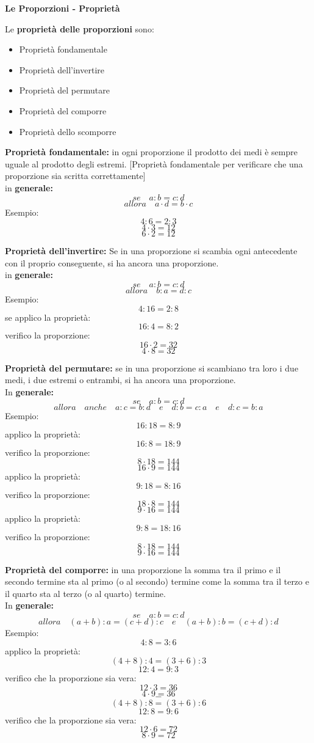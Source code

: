 \documentclass[14pt]{extarticle}
\begin{document}
\begin{center}
    \LARGE{\textbf{Le Proporzioni - Proprietà}}
\end{center}
\vspace{1cm}
Le \textbf{proprietà delle proporzioni} sono:
\begin{itemize}
    \item Proprietà fondamentale
    \item Proprietà dell'invertire
    \item Proprietà del permutare
    \item Proprietà del comporre
    \item Proprietà dello scomporre
\end{itemize}
\textbf{Proprietà fondamentale:} in ogni proporzione il prodotto dei medi è sempre uguale al prodotto degli estremi. [Proprietà fondamentale per verificare che una proporzione sia scritta correttamente]\\
in \textbf{generale:}
\[se\quad a:b=c:d\]
\[allora \quad a\cdot d=b\cdot c\]
Esempio: 
\[4:6=2:3\]
\[4\cdot3=12\]
\[6\cdot2=12\]

\textbf{Proprietà dell'invertire:} Se in una proporzione si scambia ogni antecedente con il proprio conseguente, si ha ancora una proporzione.\\
in \textbf{generale:}
\[se\quad a:b=c:d\]
\[allora \quad b:a=d:c\]
Esempio:
\[4:16=2:8\]
se applico la proprietà:
\[16:4=8:2\]
verifico la proporzione:
\[16\cdot2=32\]
\[4\cdot8=32\]

\textbf{Proprietà del permutare:} se in una proporzione si scambiano tra loro i due medi, i due estremi o entrambi, si ha ancora una proporzione. \\
In \textbf{generale:}
\[se\quad a:b=c:d\]
\[allora\quad anche\quad a:c=b:d\quad e\quad d:b=c:a\quad e\quad d:c=b:a\]
Esempio:
\[16:18=8:9\]
applico la proprietà: 
\[16:8=18:9\]
verifico la proporzione:
\[8\cdot18=144\]
\[16\cdot9=144\]
applico la proprietà: 
\[9:18=8:16\]
verifico la proporzione:
\[18\cdot8=144\]
\[9\cdot16=144\]
applico la proprietà: 
\[9:8=18:16\]
verifico la proporzione:
\[8\cdot18=144\]
\[9\cdot16=144\]

\textbf{Proprietà del comporre:} in una proporzione la somma tra il primo e il secondo termine sta al primo (o al secondo) termine come la somma tra il terzo e il quarto sta al terzo (o al quarto) termine.\\
In \textbf{generale:}
\[se\quad a:b=c:d\]
\[allora\quad(a+b):a= (c+d):c \quad e \quad (a+b):b=(c+d):d\]
Esempio:\\
\[4:8=3:6\]
applico la proprietà:
\[(4+8):4=(3+6):3\]
\[12:4=9:3\]
verifico che la proporzione sia vera:
\[12\cdot3=36\]
\[4\cdot9=36\]
\[-\]
\[(4+8):8=(3+6):6\]
\[12:8=9:6\]
verifico che la proporzione sia vera:
\[12\cdot6=72\]
\[8\cdot9=72\]
\end{document}
